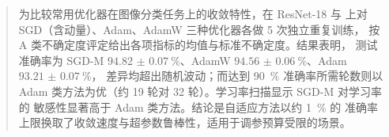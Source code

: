 
\begin{abstract}
为比较常用优化器在图像分类任务上的收敛特性，在 ResNet-18 与 \dataset{}
上对 SGD（含动量）、Adam、AdamW 三种优化器各做 5 次独立重复训练，
按 A 类不确定度评定给出各项指标的均值与标准不确定度。结果表明，
测试准确率为 SGD-M $\qty{94.82(7)}{\percent}$、AdamW
$\qty{94.56(6)}{\percent}$、Adam $\qty{93.21(7)}{\percent}$，
差异均超出随机波动；而达到 \qty{90}{\percent} 准确率所需轮数则以
Adam 类方法为优（约 19 轮对 32 轮）。学习率扫描显示 SGD-M 对学习率的
敏感性显著高于 Adam 类方法。结论是自适应方法以约 \qty{1}{\percent} 的
准确率上限换取了收敛速度与超参数鲁棒性，适用于调参预算受限的场景。
\end{abstract}
